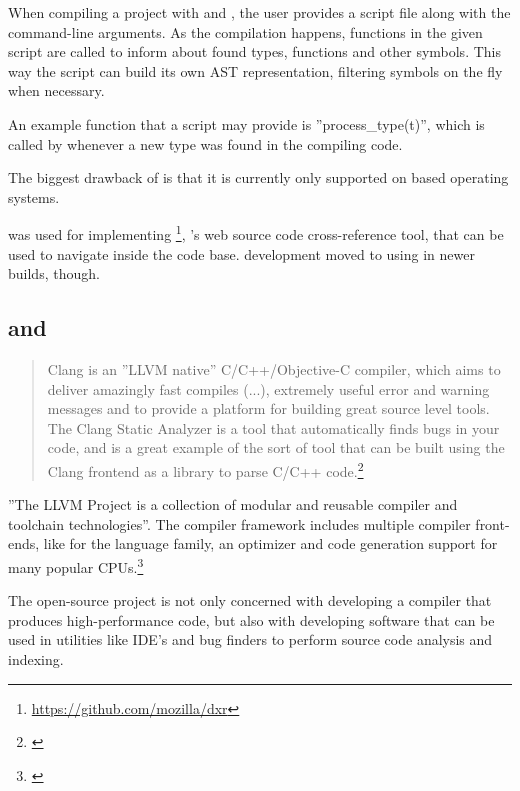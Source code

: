 When compiling a project with  and , the user provides a script file along with the command-line arguments. As the compilation happens, functions in the given script are called to inform about found types, functions and other symbols. This way the script can build its own AST representation, filtering symbols on the fly when necessary.

An example function that a script may provide is ''process\_type(t)'', which is called by  whenever a new type was found in the compiling code.

The biggest drawback of  is that it is currently only supported on  based operating systems.

 was used for implementing \footnote{\url{https://github.com/mozilla/dxr}}, 's web source code cross-reference tool, that can be used to navigate inside the  code base.  development moved to using  in newer builds, though.

\subsection{ and }
\label{sec:Clang}

\begin{quotation}
Clang is an ''LLVM native'' C/C++/Objective-C compiler, which aims to deliver amazingly fast compiles (...), extremely useful error and warning messages and to provide a platform for building great source level tools. The Clang Static Analyzer is a tool that automatically finds bugs in your code, and is a great example of the sort of tool that can be built using the Clang frontend as a library to parse C/C++ code.\footnote{\citep{LLVMHP}}
\end{quotation}

''The LLVM Project is a collection of modular and reusable compiler and toolchain technologies''. The  compiler framework includes multiple compiler front-ends, like  for the  language family, an optimizer and code generation support for many popular CPUs.\footnote{\citep{LLVMHP}}

The open-source  project is not only concerned with developing a compiler that produces high-performance code, but also with developing software that can be used in utilities like IDE's and bug finders to perform source code analysis and indexing.

